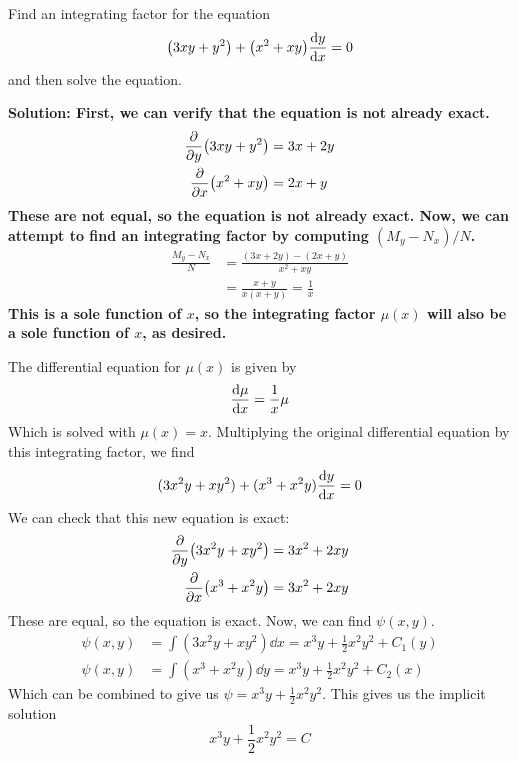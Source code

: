 \begin{example}
    Find an integrating factor for the equation 
    \[ \pqty{3xy + y^2} + \pqty{x^2+xy}\dv{y}{x} = 0 \]
    and then solve the equation. \par
    \bf{Solution:} First, we can verify that the equation is not already exact.
    \begin{align*}
        \pdv{y} \pqty{3xy + y^2}  &= 3x + 2y \\
        \pdv{x} \pqty{x^2+xy} &= 2x +y 
    \end{align*}
    These are not equal, so the equation is not already exact. Now, we can attempt to find an integrating factor by computing $(M_y-N_x)/N$.
    \begin{align*}
        \frac{M_y - N_x}{N} &= \frac{(3x+2y)-(2x+y)}{x^2+xy} \\
        &= \frac{x+y}{x(x+y)} = \frac{1}{x}
    \end{align*}
    This is a sole function of $x$, so the integrating factor $\mu(x)$ will also be a sole function of $x$, as desired. \par
    The differential equation for $\mu(x)$ is given by
    \[ \dv{\mu}{x} = \frac{1}{x} \mu \]
    Which is solved with $\mu(x) = x$. Multiplying the original differential equation by this integrating factor, we find
    \[ (3x^2y+xy^2) + (x^3+x^2y)\dv{y}{x} = 0 \]
    We can check that this new equation is exact:
    \begin{align*}
        \pdv{y} \pqty{3x^2y + xy^2}  &= 3x^2 + 2xy \\
        \pdv{x} \pqty{x^3+x^2y} &= 3x^2+2xy
    \end{align*}
    These are equal, so the equation is exact. Now, we can find $\psi(x,y)$.
    \begin{align*}
        \psi(x,y) &= \int (3x^2y+xy^2)\dd x = x^3y + \frac{1}{2}x^2y^2 + C_1(y) \\
        \psi(x,y) &= \int (x^3 + x^2y)\dd y = x^3y + \frac{1}{2}x^2y^2+ C_2(x)
    \end{align*}
    Which can be combined to give us $\psi = x^3y + \frac{1}{2}x^2y^2$. This gives us the implicit solution
    \[ x^3y + \frac{1}{2}x^2y^2 = C \]
\end{example}
